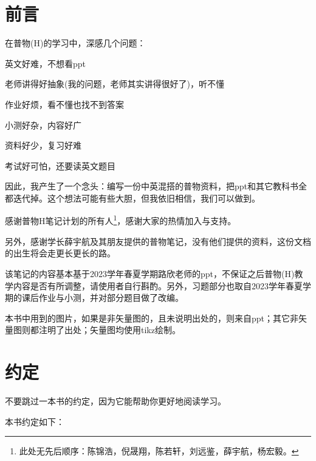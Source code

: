 	\chapter{前言}
	在普物(H)的学习中，深感几个问题：
	\begin{Itemize}
		\item 英文好难，不想看ppt
		\item 老师讲得好抽象(我的问题，老师其实讲得很好了)，听不懂
		\item 作业好烦，看不懂也找不到答案
		\item 小测好杂，内容好广
		\item 资料好少，复习好难
		\item 考试好可怕，还要读英文题目
	\end{Itemize}
	
	因此，我产生了一个念头：编写一份中英混搭的普物资料，把ppt和其它教科书全都迭代掉。这个想法可能有些大胆，但我依旧相信，我们可以做到。
	
	感谢普物H笔记计划的所有人\footnote{此处无先后顺序：陈锦浩，倪晟翔，陈若轩，刘远鉴，薛宇航，杨宏毅。}，感谢大家的热情加入与支持。
	
	另外，感谢学长薛宇航及其朋友提供的普物笔记，没有他们提供的资料，这份文档的出生将会走更长更长的路。
	
	该笔记的内容基本基于2023学年春夏学期路欣老师的ppt，不保证之后普物(H)教学内容是否有所调整，请使用者自行斟酌。另外，习题部分也取自2023学年春夏学期的课后作业与小测，并对部分题目做了改编。
	
	本书中用到的图片，如果是非矢量图的，且未说明出处的，则来自ppt；其它非矢量图则都注明了出处；矢量图均使用tikz绘制。
	\chapter{约定}
	不要跳过一本书的约定，因为它能帮助你更好地阅读学习。
	
	本书约定如下：
	\setcounter{chapter}{-1}
	
